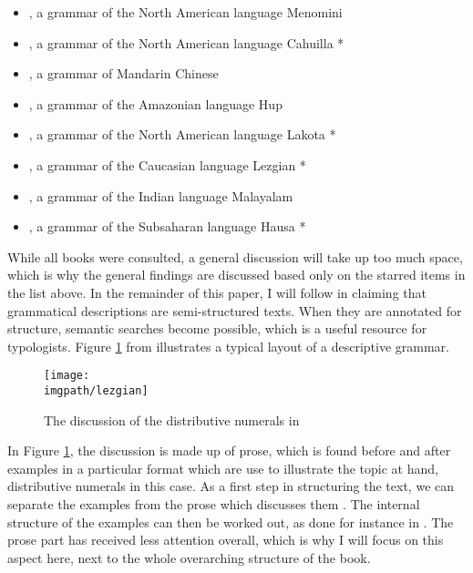 \begin{itemize}
 \item \citet{Bloomfield1962}, a grammar of the North American language Menomini
 \item \citet{Seiler1985}, a grammar of the North American language Cahuilla *
 \item \citet{LiEtAl1981}, a grammar of Mandarin Chinese
 \item \citet{Epps2008}, a grammar of the Amazonian language Hup
 \item \citet{Buechel1939}, a grammar of the North American language Lakota *
 \item \citet{Haspelmath1993}, a grammar of the Caucasian language Lezgian * 
 \item \citet{Frohnmeyer1889}, a grammar of the Indian language Malayalam
 \item \citet{Newman2000}, a grammar of the Subsaharan language Hausa *
\end{itemize}

While all books were consulted, a general discussion will take up too much space, which is why the general findings are discussed based only on the starred items in the list above. In the remainder of this paper, I will follow \citet{Good2004} in  claiming that grammatical descriptions are semi-structured texts. When they are annotated for structure, semantic searches become possible, which is a useful resource for typologists. Figure \ref{fig:lezgian} from \citet{Haspelmath1993} illustrates a typical layout of a descriptive grammar.


\begin{figure}
\texttt{[image: \\imgpath/lezgian]} 
\caption{The discussion of the distributive numerals in \citet{Haspelmath1993}}
\label{fig:lezgian}
\end{figure}


In Figure \ref{fig:lezgian}, the discussion is made up of prose, which is found before and after examples in a particular format which are use to illustrate the topic at hand, distributive numerals in this case. As a first step in structuring the text, we can separate the examples from the prose which discusses them \citep[cf.][]{Good2004}. The internal structure of the examples can then be worked out, as done for instance in \citet{BowEtAl2003}. The prose part has received less attention overall, which is why I will focus on this aspect here, next to the whole overarching structure of the book.

